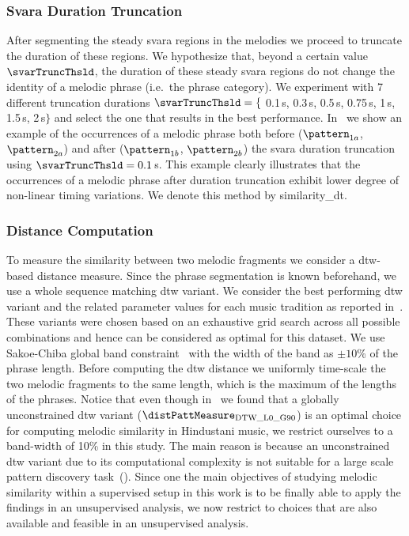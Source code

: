 \subsubsection{Svara Duration Truncation}
\label{sec:patterns_improving_similarity_svara_duration_trucation}

After segmenting the steady \gls{svara} regions in the melodies we proceed to truncate the duration of these regions. We hypothesize that, beyond a certain value $\svarTruncThsld$, the duration of these steady \gls{svara} regions do not change the identity of a melodic phrase (i.e.~the phrase category). We experiment with 7 different truncation durations $\svarTruncThsld = \lbrace$ 0.1\,s, 0.3\,s, 0.5\,s, 0.75\,s, 1\,s, 1.5\,s, 2\,s$\rbrace$ and select the one that results in the best performance. In~
we show an example of the occurrences of a melodic phrase both before ($\pattern_{1a}$, $\pattern_{2a}$) and after ($\pattern_{1b}$, $\pattern_{2b}$) the \gls{svara} duration truncation using $\svarTruncThsld = 0.1$\,s. This example clearly illustrates that the occurrences of a melodic phrase after duration truncation exhibit lower degree of non-linear timing variations. We denote this method by \acrshort{similarity_dt}.

\subsubsection{Distance Computation}
\label{sec:patterns_improving_similarity_similarity_computation}

To measure the similarity between two melodic fragments we consider a \gls{dtw}-based distance measure. Since the phrase segmentation is known beforehand, we use a whole sequence matching \gls{dtw} variant. We consider the best performing \gls{dtw} variant and the related parameter values for each music tradition as reported in~. These variants were chosen based on an exhaustive grid search across all possible combinations and hence can be considered as optimal for this dataset. We use Sakoe-Chiba global band constraint~\cite{Sakoe78TASLP} with the width of the band as $\pm10$\% of the phrase length. Before computing the \gls{dtw} distance we uniformly time-scale the two melodic fragments to the same length, which is the maximum of the lengths of the phrases. Notice that even though in~ we found that a globally unconstrained \gls{dtw} variant ($\distPattMeasure_{\mathrm{DTW\_L0\_G90}}$) is an optimal choice for computing melodic similarity in Hindustani music, we restrict ourselves to a band-width of 10\% in this study. The main reason is because an unconstrained \gls{dtw} variant due to its computational complexity is not suitable for a large scale pattern discovery task~(). Since one the main objectives of studying melodic similarity within a supervised setup in this work is to be finally able to apply the findings in an unsupervised analysis, we now restrict to choices that are also available and feasible in an unsupervised analysis.


